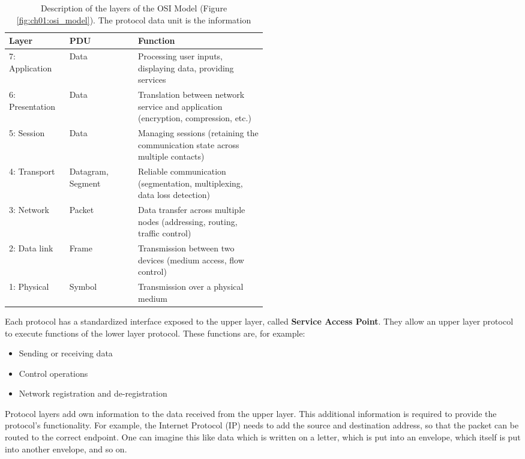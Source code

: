 \begin{table}[H]
	\caption{Description of the layers of the OSI Model (Figure \ref{fig:ch01:osi_model}). The protocol data unit is the information }
	\begin{tabular}{|l|l|p{0.5\linewidth}|}
		\hline
		Layer & PDU & Function \\
		\hline
		\hline
		7: Application & Data & Processing user inputs, displaying data, providing services \\
		\hline
		6: Presentation & Data & Translation between network service and application (encryption, compression, etc.) \\
		\hline
		5: Session & Data & Managing sessions (retaining the communication state across multiple contacts) \\
		\hline
		4: Transport & Datagram, Segment & Reliable communication (segmentation, multiplexing, data loss detection) \\
		\hline
		3: Network & Packet & Data transfer across multiple nodes (addressing, routing, traffic control) \\
		\hline
		2: Data link & Frame & Transmission between two devices (medium access, flow control) \\
		\hline
		1: Physical & Symbol & Transmission over a physical medium \\
		\hline
	\end{tabular}
\end{table}

Each protocol has a standardized interface exposed to the upper layer, called \textbf{Service Access Point}. They allow an upper layer protocol to execute functions of the lower layer protocol. These functions are, for example:
\begin{itemize}
	\item Sending or receiving data
	\item Control operations
	\item Network registration and de-registration
\end{itemize}

Protocol layers add own information to the data received from the upper layer. This additional information is required to provide the protocol's functionality. For example, the Internet Protocol (IP) needs to add the source and destination address, so that the packet can be routed to the correct endpoint. One can imagine this like data which is written on a letter, which is put into an envelope, which itself is put into another envelope, and so on.

